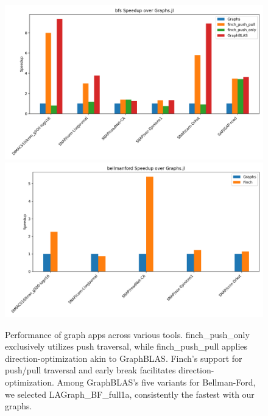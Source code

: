 \begin{figure}[t]
	\includegraphics[width=0.5\linewidth]{bfs_speedup_over_graphs.jl.png}%
	\includegraphics[width=0.5\linewidth]{bellmanford_speedup_over_graphs.jl.png}
    \vspace{-12pt}
    \caption{Performance of graph apps across various tools. finch\_push\_only exclusively utilizes push traversal, while finch\_push\_pull applies direction-optimization akin to GraphBLAS. Finch's support for push/pull traversal and early break facilitates direction-optimization. Among GraphBLAS's five variants for Bellman-Ford, we selected LAGraph\_BF\_full1a, consistently the fastest with our graphs.}
     \label{fig:graph_result}
\end{figure}